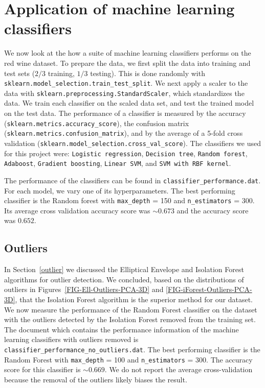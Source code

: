 \documentclass[12pt,preprint]{aastex61}
\begin{document}
 \section{Application of machine learning classifiers \label{classifiers}}

 We now look at the how a suite of machine learning classifiers
performs on the red wine dataset. To prepare the data, we first split
the data into training and test sets ($2/3$ training, $1/3$
testing). This is done randomly with
\texttt{sklearn.model\_selection.train\_test\_split}. We next apply a
scaler to the data with \texttt{sklearn.preprocessing.StandardScaler},
which standardizes the data. We train each classifier on the scaled
data set, and test the trained model on the test data. The performance
of a classifier is measured by the accuracy
(\texttt{sklearn.metrics.accuracy\_score}), the confusion matrix
(\texttt{sklearn.metrics.confusion\_matrix}), and by the average of a
5-fold cross validation
(\texttt{sklearn.model\_selection.cross\_val\_score}). The classifiers
we used for this project were: \texttt{Logistic regression},
\texttt{Decision tree}, \texttt{Random forest}, \texttt{Adaboost},
\texttt{Gradient boosting}, \texttt{Linear SVM}, and \texttt{SVM with
RBF kernel}.

The performance of the classifiers can be found in
\texttt{classifier\_performance.dat}. For each model, we vary one of
its hyperparameters. The best performing classifier is the Random
forest with \texttt{max\_depth} = 150 and \texttt{n\_estimators} =
300. Its average cross validation accuracy score was $\sim 0.673$ and
the accuracy score was $0.652$.

\subsection{Outliers}

In Section~\ref{outlier} we discussed the Elliptical Envelope and
Isolation Forest algorithms for outlier detection. We concluded, based
on the distributions of outliers in
Figures~\ref{FIG-Ell-Outliers-PCA-3D} and
\ref{FIG-iForest-Outliers-PCA-3D}, that the Isolation Forest algorithm
is the superior method for our dataset. We now measure the performance
of the Random Forest classifier on the dataset with the outliers
detected by the Isolation Forest removed from the training set. The
document which contains the performance information of the machine
learning classifiers with outliers removed is
\texttt{classifier\_performance\_no\_outliers.dat}. The best
performing classifier is the Random Forest with \texttt{max\_depth} =
100 and \texttt{n\_estimators} = 300.  The accuracy score for this
classifier is $\sim 0.669$. We do not report the average
cross-validation because the removal of the outliers likely biases the
result.
\end{document}
